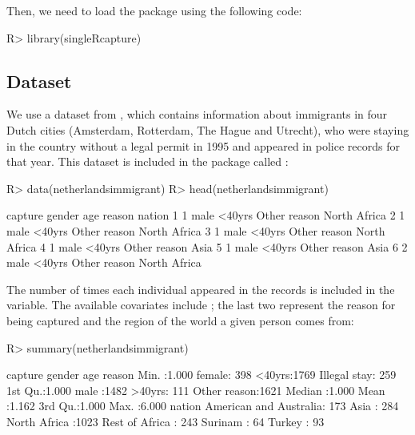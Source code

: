 \documentclass[nojss]{jss}
\newcommand{\1}{\mathcal{I}} \newcommand{\bZero}{\boldsymbol{0}}
\begin{document}
Then, we need to load the package using the following code:

\begin{CodeChunk}
\begin{CodeInput}
R> library(singleRcapture)
\end{CodeInput}
\end{CodeChunk}

\subsection{Dataset}\label{dataset}

We use a dataset from \cite{ztpoisson}, which contains information about
immigrants in four Dutch cities (Amsterdam, Rotterdam, The Hague and
Utrecht), who were staying in the country without a legal permit in 1995
and appeared in police records for that year. This dataset is included
in the package called :

\begin{CodeChunk}
\begin{CodeInput}
R> data(netherlandsimmigrant)
R> head(netherlandsimmigrant)
\end{CodeInput}
\begin{CodeOutput}
  capture gender    age       reason       nation
1       1   male <40yrs Other reason North Africa
2       1   male <40yrs Other reason North Africa
3       1   male <40yrs Other reason North Africa
4       1   male <40yrs Other reason         Asia
5       1   male <40yrs Other reason         Asia
6       2   male <40yrs Other reason North Africa
\end{CodeOutput}
\end{CodeChunk}

The number of times each individual appeared in the records is included
in the  variable. The available covariates include
; the last two represent the reason
for being captured and the region of the world a given person comes
from:

\begin{CodeChunk}
\begin{CodeInput}
R> summary(netherlandsimmigrant)
\end{CodeInput}
\begin{CodeOutput}
    capture         gender         age                reason
 Min.   :1.000   female: 398   <40yrs:1769   Illegal stay: 259
 1st Qu.:1.000   male  :1482   >40yrs: 111   Other reason:1621
 Median :1.000
 Mean   :1.162
 3rd Qu.:1.000
 Max.   :6.000
                    nation
 American and Australia: 173
 Asia                  : 284
 North Africa          :1023
 Rest of Africa        : 243
 Surinam               :  64
 Turkey                :  93
\end{CodeOutput}
\end{CodeChunk}
\end{document}
